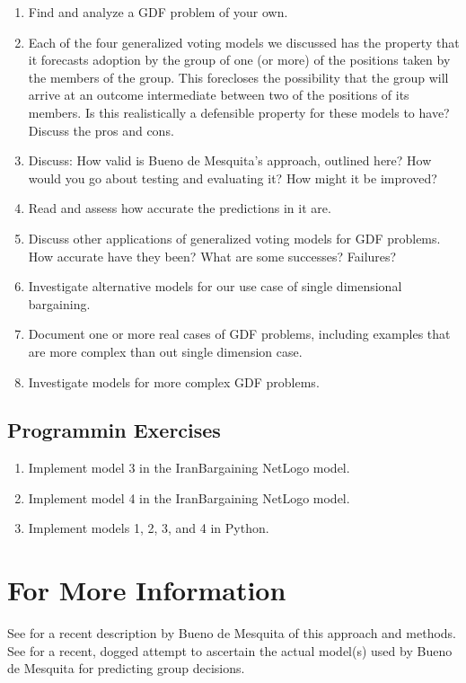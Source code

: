 \begin{enumerate}
\item Find and analyze a GDF problem of your own.
\item Each of the four generalized voting models we discussed has the property that it forecasts adoption by the group of one (or more) of the positions taken by the members of the group. This forecloses the possibility that the group will arrive at an outcome intermediate between two of the positions of its members. Is this realistically a defensible property for these models to have? Discuss the pros and cons.
\item Discuss: How valid is Bueno de Mesquita's  approach, outlined here? How would you go about testing and evaluating it? How might it be improved?
\item Read  \cite{mesquita_1984} and assess how accurate  the predictions in it are.
\item Discuss other applications of generalized voting models for GDF problems. How accurate have they been? What are some successes? Failures?
\item Investigate alternative models for our use case of single dimensional bargaining.
\item Document one or more real cases of GDF problems, including examples that are more complex than out single dimension case.
\item Investigate models for more complex GDF problems.
\end{enumerate}

\subsection{Programmin Exercises}

\begin{enumerate}
\item Implement model 3 in the IranBargaining NetLogo model.
\item Implement model 4 in the IranBargaining NetLogo model.
\item Implement models 1, 2, 3, and 4 in Python.
\end{enumerate}



\section{For More Information}

See \cite{buenodemesquita_2009} for a recent description by Bueno de Mesquita of this approach and methods. See \cite{scholz_calbert_smith_2011} for a recent, dogged attempt to ascertain the actual model(s) used by Bueno de Mesquita for predicting group decisions.


